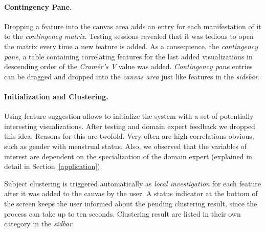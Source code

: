 \documentclass[journal]{style/vgtc} 			          %
\newcommand{\com}[1]{\textcolor{orange}{\uline{#1}}}
\begin{document}
\paragraph{Contingency Pane.}
Dropping a feature into the canvas area adds an entry for each manifestation of it to the \emph{contingency matrix}.
%
Testing sessions revealed that it was tedious to open the matrix every time a new feature is added. 
%
As a consequence, the \emph{contingency pane}, a table containing correlating features for the last added visualizations in descending order of the \emph{Cram\'{e}r's V} value was added.
%
\emph{Contingency pane} entries can be dragged and dropped into the \emph{canvas area} just like features in the \emph{sidebar}.
%
\paragraph{Initialization and Clustering.}
Using feature suggestion allows to initialize the system with a set of potentially interesting visualizations.
%
After testing and domain expert feedback we dropped this idea.
%
Reasons for this are twofold.
%
Very often are high correlations obvious, such as gender with menstrual status.
%
Also, we observed that the variables of interest are dependent on the specialization of the domain expert (explained in detail in Section~\ref{application}).

Subject clustering is triggered automatically as \emph{local investigation} for each feature after it was added to the canvas by the user.
%
A status indicator at the bottom of the screen keeps the user informed about the pending clustering result, since the process can take up to ten seconds.
%
Clustering result are listed in their own category in the \emph{sidbar}.
%
\end{document}
